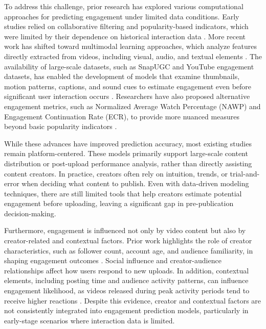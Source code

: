 To address this challenge, prior research has explored various computational approaches for predicting engagement under limited data conditions. Early studies relied on collaborative filtering and popularity-based indicators, which were limited by their dependence on historical interaction data \cite{he2017neural, zhou2010impact}. More recent work has shifted toward multimodal learning approaches, which analyze features directly extracted from videos, including visual, audio, and textual elements \cite{li2024delving, wu2018beyond}. The availability of large-scale datasets, such as SnapUGC and YouTube engagement datasets, has enabled the development of models that examine thumbnails, motion patterns, captions, and sound cues to estimate engagement even before significant user interaction occurs \cite{li2024delving, wu2018beyond}. Researchers have also proposed alternative engagement metrics, such as Normalized Average Watch Percentage (NAWP) and Engagement Continuation Rate (ECR), to provide more nuanced measures beyond basic popularity indicators \cite{li2024delving}.

While these advances have improved prediction accuracy, most existing studies remain platform-centered. These models primarily support large-scale content distribution or post-upload performance analysis, rather than directly assisting content creators. In practice, creators often rely on intuition, trends, or trial-and-error when deciding what content to publish. Even with data-driven modeling techniques, there are still limited tools that help creators estimate potential engagement before uploading, leaving a significant gap in pre-publication decision-making.

Furthermore, engagement is influenced not only by video content but also by creator-related and contextual factors. Prior work highlights the role of creator characteristics, such as follower count, account age, and audience familiarity, in shaping engagement outcomes \cite{peng2024untangling, sadeque2019predicting, zannettou2024analyzing}. Social influence and creator-audience relationships affect how users respond to new uploads. In addition, contextual elements, including posting time and audience activity patterns, can influence engagement likelihood, as videos released during peak activity periods tend to receive higher reactions \cite{kanuri2018scheduling, manic2024short, spasojevic2015post}. Despite this evidence, creator and contextual factors are not consistently integrated into engagement prediction models, particularly in early-stage scenarios where interaction data is limited.

